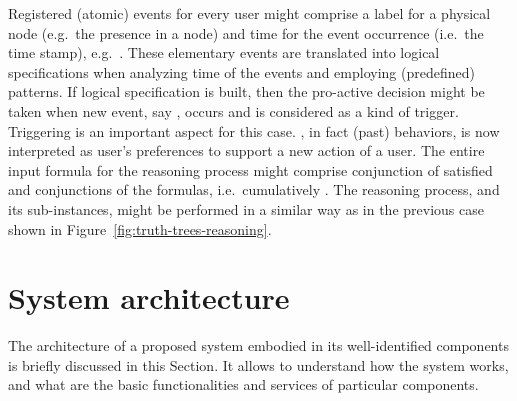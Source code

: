 \documentclass[runningheads,a4paper]{llncs}
\begin{document}
Registered (atomic) events for every user might comprise a label for
a physical node (e.g.\ the presence in a node)
and time for the event occurrence (i.e.\ the time stamp),
e.g.\ .
These elementary events are translated into logical specifications
when analyzing time of the events and employing (predefined) patterns.
If logical specification  is built,
then the pro-active decision might be taken when new event, say , occurs and is considered as a kind of trigger.
Triggering is an important aspect for this case.
, in fact (past) behaviors, is now interpreted as user's preferences to
support a new action of a user.
The entire input formula for the reasoning process might comprise
conjunction of satisfied  and conjunctions  of the  formulas,
i.e.\ cumulatively .
The reasoning process, and its sub-instances,
might be performed in a similar way as in the previous case
shown in Figure~\ref{fig:truth-trees-reasoning}.






\section{System architecture}
\label{sec:architecture}

The architecture of a proposed system embodied in its well-identified components is
briefly discussed in this Section.
It allows to understand how the system works,
and what are the basic functionalities and services of particular components.
\end{document}

